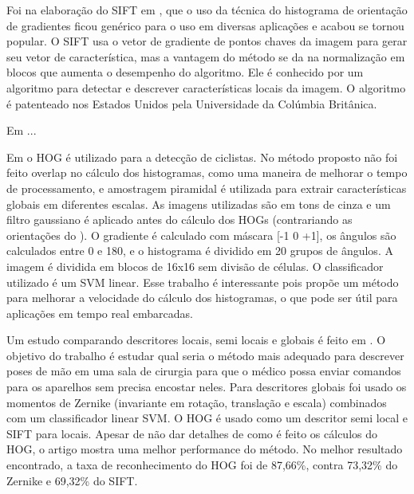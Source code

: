 Foi na elaboração do SIFT em \cite{lowe2004distinctive}, que o uso da técnica do histograma de orientação de gradientes ficou genérico para o uso em diversas aplicações e acabou se tornou popular. O SIFT usa o vetor de gradiente de pontos chaves da imagem para gerar seu vetor de característica, mas a vantagem do método se da na normalização em blocos que aumenta o desempenho do algoritmo. Ele é conhecido por um algoritmo para detectar e descrever características locais da imagem. O algoritmo é patenteado nos Estados Unidos pela Universidade da Colúmbia Britânica.

Em \cite{dalal2005histograms} ...

Em \cite{li2010effective} o HOG é utilizado para a detecção de ciclistas. No método proposto não foi feito overlap no cálculo dos histogramas, como uma maneira de melhorar o tempo de processamento, e amostragem piramidal é utilizada para extrair características globais em diferentes escalas. As imagens utilizadas são em tons de cinza e um filtro gaussiano é aplicado antes do cálculo dos HOGs (contrariando as orientações do ). O gradiente é calculado com máscara [-1 0 +1], os ângulos são calculados entre 0 e 180, e o histograma é dividido em 20 grupos de ângulos. A imagem é dividida em blocos de 16x16 sem divisão de células. O classificador utilizado é um SVM linear. Esse trabalho é interessante pois propõe um método para melhorar a velocidade do cálculo dos histogramas, o que pode ser útil para aplicações em tempo real embarcadas.

Um estudo comparando descritores locais, semi locais e globais é feito em \cite{collumeau2011hand}. O objetivo do trabalho é estudar qual seria o método mais adequado para descrever poses de mão em uma sala de cirurgia para que o médico possa enviar comandos para os aparelhos sem precisa encostar neles. Para descritores globais foi usado os momentos de Zernike (invariante em rotação, translação e escala) combinados com um classificador linear SVM. O HOG é usado como um descritor semi local e SIFT para locais. Apesar de não dar detalhes de como é feito os cálculos do HOG, o artigo mostra uma melhor performance do método. No melhor resultado encontrado, a taxa de reconhecimento do HOG foi de 87,66\%, contra 73,32\% do Zernike e 69,32\% do SIFT.

